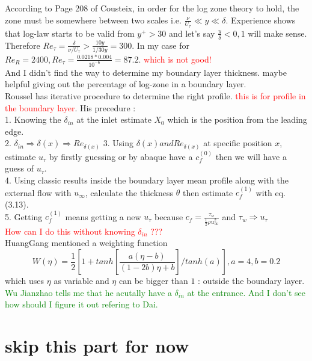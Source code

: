 \documentclass[a4paper,10pt]{article}
\begin{document}
According to Page 208 of Cousteix, in order for the log zone theory to hold, the zone must be somewhere between two scales i.e. $\frac{\nu}{U_{\tau}} \ll y \ll \delta$. Experience shows that log-law starts to be valid from $y^+ > 30$ and let's say $\frac{y}{\delta} < 0,1$ will make sense. Therefore $Re_{\tau} = \frac{\delta}{\nu/U_{\tau}} > \frac{10y}{1/30y} = 300$. In my case for $Re_R=2400, Re_{\tau} = \frac{0.0218*0.004}{10^{-6}}=87.2.$ \textcolor{red}{which is not good!} \\

And I didn't find the way to determine my boundary layer thickness. \cite{Purtell1981} maybe helpful giving out the percentage of log-zone in a boundary layer.\\

Roussel \cite{Roussel2016} has iterative procedure to determine the right profile. \textcolor{red}{this is for profile in the boundary layer}. His precedure : \\
1. Knowing the $\delta_{in}$ at the inlet estimate $X_0$ which is the position from the leading edge. \\
2. $\delta_{in} \Longrightarrow \delta(x) \Longrightarrow Re_{\delta(x)}$
3. Using $\delta(x) and Re_{\delta(x)}$ at specific position $x$, estimate $u_\tau$ by firstly guessing or by abaque have a $c_f^{(0)}$ then we will have a guess of $u_\tau$. \\
4. Using classic results inside the boundary layer mean profile along with the external flow with $u_\infty$, calculate the thickness $\theta$ then estimate $c_f^{(1)}$ with eq. (3.13). \\
5. Getting $c_f^{(1)}$ means getting a new $u_\tau$ because $c_f = \frac{\tau_w}{\frac{1}{2}\rho u_\infty^2}$ and $\tau_w \Longrightarrow u_\tau$\\
\textcolor{red}{How can I do this without knowing $\delta_{in}$ ???}\\
HuangGang \cite{huang2015} mentioned a weighting function
$$W(\eta) = \frac{1}{2} [1+ tanh[\frac{a(\eta-b)}{(1-2b)\eta+b}]/tanh(a)], a = 4, b = 0.2$$ which uses $\eta$ as variable and $\eta$ can be bigger than $1$ : outside the boundary layer. \textcolor{green}{Wu Jianzhao tells me that he acutally have a $\delta_{in}$ at the entrance. And I don't see how should I figure it out refering to Dai.}

\section{skip this part for now}
\end{document}
